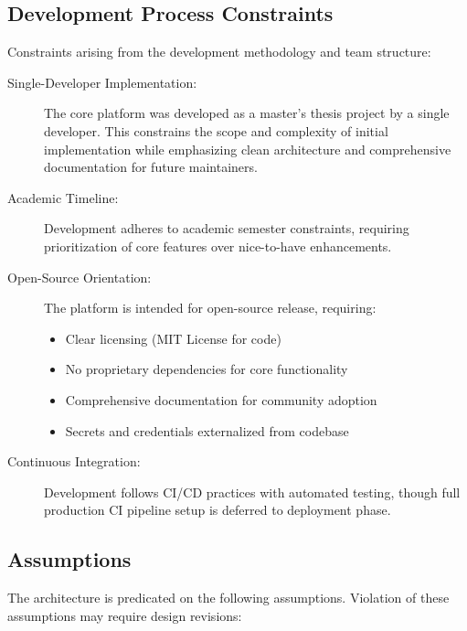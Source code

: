 \subsection{Development Process Constraints}
\label{subsec:development-constraints}

Constraints arising from the development methodology and team structure:

\begin{description}
    \item[Single-Developer Implementation:] The core platform was developed as a master's thesis project by a single developer. This constrains the scope and complexity of initial implementation while emphasizing clean architecture and comprehensive documentation for future maintainers.
    
    \item[Academic Timeline:] Development adheres to academic semester constraints, requiring prioritization of core features over nice-to-have enhancements.
    
    \item[Open-Source Orientation:] The platform is intended for open-source release, requiring:
    \begin{itemize}
        \item Clear licensing (MIT License for code)
        \item No proprietary dependencies for core functionality
        \item Comprehensive documentation for community adoption
        \item Secrets and credentials externalized from codebase
    \end{itemize}
    
    \item[Continuous Integration:] Development follows CI/CD practices with automated testing, though full production CI pipeline setup is deferred to deployment phase.
\end{description}

\subsection{Assumptions}
\label{subsec:assumptions}

The architecture is predicated on the following assumptions. Violation of these assumptions may require design revisions:

